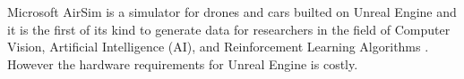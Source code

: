 Microsoft AirSim is a simulator for drones and cars builted on Unreal Engine and it is the first of its kind to generate data for researchers in the field of Computer Vision, Artificial Intelligence (AI), and Reinforcement Learning Algorithms \cite{airsim2017fsr}. However the hardware requirements for Unreal Engine is costly.